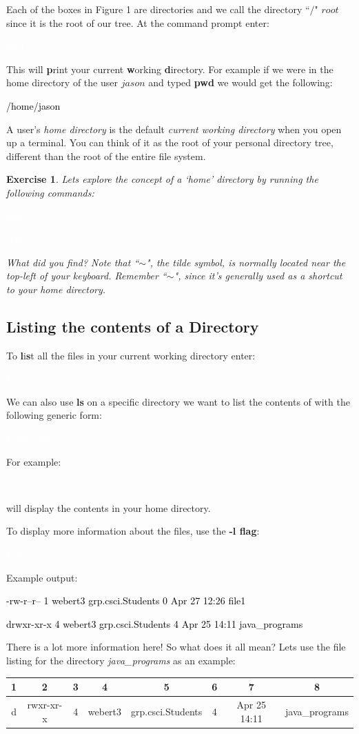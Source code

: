\documentclass[oneside]{book}
\newcommand{\commandline}[1]{\begin{center} \colorbox{Dark}{\textcolor{white}{#1}} \end{center}}
\newcommand{\exampleout}[1]{\begin{center} \colorbox{Light}{\textcolor{black}{#1}} \end{center}}
\newtheorem{ex}{Exercise}[chapter]
\begin{document}
Each of the boxes in Figure 1 are directories and we call the directory ``$/$" $root$ since it is the root of our tree. At the command prompt enter:
	\commandline{pwd}
  This will \textbf{p}rint your current \textbf{w}orking \textbf{d}irectory. For example if we were in the home directory of the user $jason$ and typed \textbf{pwd} we would get the following:
	\exampleout {/home/jason}
	
A user's \textit{home directory} is the default \textit{current working directory} when you open up a terminal. You can think of it as the root of your personal directory tree, different than the root of the entire file system.\\

\begin{ex} 
	Lets explore the concept of a `home' directory by running the following commands:
	\commandline{pwd}
	\commandline{echo $\sim$ }
	What did you find? Note that ``$\sim$", the tilde symbol, is normally located near the top-left of your keyboard. Remember ``$\sim$", since it's generally used as a shortcut to your home directory.
\end{ex}

\subsection{Listing the contents of a Directory}
To \textbf{l}i\textbf{s}t all the files in your current working directory enter:
	\commandline{ls}
	We can also use \textbf{ls} on a specific directory we want to list the contents of with the following generic form:
  	\commandline{ls dirname}
For example:
	\commandline{ls $\sim$}
will display the contents in your home directory.

To display more information about the files, use the \textbf{-l flag}:

\commandline{ls -l}

Example output:
\exampleout{-rw-r--r-- 1 webert3 grp.csci.Students 0 Apr 27 12:26 file1}
\exampleout{drwxr-xr-x 4 webert3 grp.csci.Students 4 Apr 25 14:11 java\_programs}

There is a lot more information here! So what does it all mean? Lets use the file listing for the directory \textit{java\_programs} as an example:

\begin{center}
    \begin{tabular}{|c|c|c|c|c|c|c|c|}
        \hline
	    1 & 2 & 3 & 4 & 5 & 6 & 7 & 8 \\
	    \hline
        d & rwxr-xr-x & 4 & webert3 & grp.csci.Students & 4 & Apr 25 14:11 & java\_programs\\
        \hline
    \end{tabular}
\end{center}
	
\end{document}
